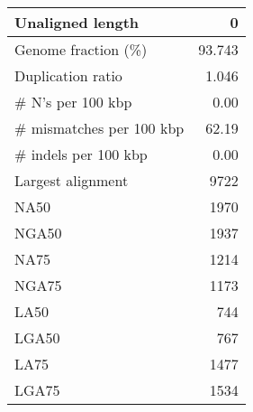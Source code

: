 \documentclass[12pt,a4paper]{article}
\begin{document}
\begin{table}[ht]
\begin{center}
\begin{tabular}{|l*{1}{|r}|}
Unaligned length & 0 \\ \hline
Genome fraction (\%) & 93.743 \\ \hline
Duplication ratio & 1.046 \\ \hline
\# N's per 100 kbp & 0.00 \\ \hline
\# mismatches per 100 kbp & 62.19 \\ \hline
\# indels per 100 kbp & 0.00 \\ \hline
Largest alignment & 9722 \\ \hline
NA50 & 1970 \\ \hline
NGA50 & 1937 \\ \hline
NA75 & 1214 \\ \hline
NGA75 & 1173 \\ \hline
LA50 & 744 \\ \hline
LGA50 & 767 \\ \hline
LA75 & 1477 \\ \hline
LGA75 & 1534 \\ \hline
\end{tabular}
\end{center}
\end{table}
\end{document}
